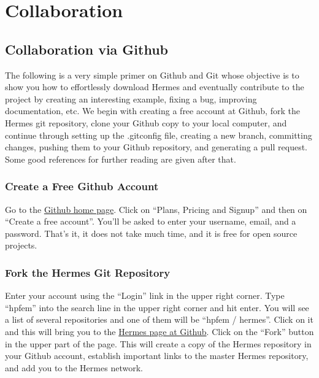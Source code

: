 \documentclass[a4paper,0pt,english]{sphinxmanual}
\begin{document}
\chapter{Collaboration}
\label{src/collaboration:collaboration}\label{src/collaboration::doc}

\section{Collaboration via Github}
\label{src/collaboration:collaboration-via-github}
The following is a very simple primer on Github and Git whose objective is
to show you how to effortlessly download Hermes and eventually contribute
to the project by creating an interesting example, fixing a bug, improving
documentation, etc. We begin with creating a free account at Github, fork
the Hermes git repository, clone your Github copy to your local computer,
and continue through setting up the .gitconfig file, creating a new branch,
committing changes, pushing them to your Github repository, and generating
a pull request. Some good references for further reading are given after
that.


\subsection{Create a Free Github Account}
\label{src/collaboration:create-a-free-github-account}
Go to the \href{http://github.com}{Github home page}. Click on ``Plans, Pricing and Signup''
and then on ``Create a free account''. You'll be asked to enter your username, email,
and a password. That's it, it does not take much time, and it is free for open source
projects.


\subsection{Fork the Hermes Git Repository}
\label{src/collaboration:fork-the-hermes-git-repository}
Enter your account using the ``Login'' link in the upper right corner. Type
``hpfem'' into the search line in the upper right corner and hit enter. You
will see a list of several repositories and one of them will be ``hpfem / hermes''.
Click on it and this will bring you to the \href{http://github.com/hpfem/hermes}{Hermes page at Github}.
Click on the ``Fork'' button in the upper part of the page. This will create a copy
of the Hermes repository in your Github account, establish important links to
the master Hermes repository, and add you to the Hermes network.
\end{document}

